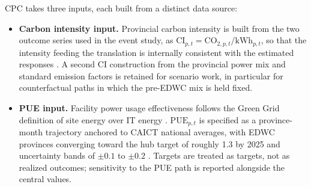 \documentclass[12pt,a4paper]{article}
\begin{document}
CPC takes three inputs, each built from a distinct data source:

\begin{itemize}
  \item \textbf{Carbon intensity input.} Provincial carbon intensity
        is built from the two outcome series used in the event study,
        as $\text{CI}_{p,t} = \text{CO}_{2,p,t} / \text{kWh}_{p,t}$,
        so that the intensity feeding the translation is internally
        consistent with the estimated responses
        \citep{shanetal-2016-newprovincialco2}. A second CI
        construction from the provincial power mix and standard
        emission factors is retained for scenario work, in particular
        for counterfactual paths in which the pre-EDWC mix is held
        fixed.

  \item \textbf{PUE input.} Facility power usage effectiveness
        follows the Green Grid definition of site energy over IT
        energy \citep{thegreengrid-2012-puecomprehensiveexamination}.
        $\text{PUE}_{p,t}$ is specified as a province-month
        trajectory anchored to CAICT national averages, with EDWC
        provinces converging toward the hub target of roughly 1.3 by
        2025 and uncertainty bands of $\pm 0.1$ to $\pm 0.2$
        \citep{chinaacademyofinformationandcommunicationstechnologyhoringernewarea-2024-zhongguolusesuanlifazhanyanjiubaogao2024nian}.
        Targets are treated as targets, not as realized outcomes;
        sensitivity to the PUE path is reported alongside the central
        values.


\end{itemize}
\end{document}
